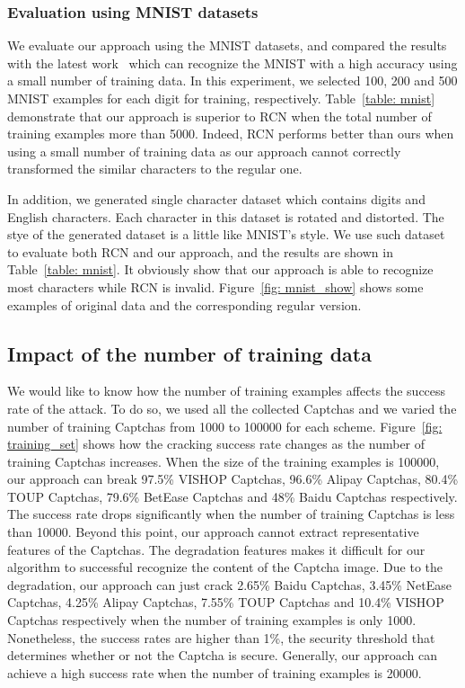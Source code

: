 \subsubsection{Evaluation using MNIST datasets}
We evaluate our approach using the MNIST datasets, and compared the results with the latest work~\cite{George2017A} which can recognize the MNIST with a high accuracy using a small number of training data. In this experiment, we selected 100, 200 and 500 MNIST examples for each digit for training, respectively.
Table~\ref{table: mnist} demonstrate that our approach is superior to RCN when the total number of training examples more than 5000. Indeed, RCN performs better than ours when using a small number of training data as our approach cannot correctly transformed the similar characters to the regular one.

In addition, we generated single character dataset which contains digits and English characters. Each character in this dataset is rotated and distorted. The stye of the generated dataset is a little like MNIST's style.
We use such dataset to evaluate both RCN and our approach, and the results are shown in Table~\ref{table: mnist}. It obviously show that our approach is able to recognize most characters while RCN is invalid. Figure~\ref{fig: mnist_show} shows some examples of original data and the corresponding regular version.

\subsection{Impact of the number of training data}
We would like to know how the number of training examples affects the success rate of the attack. To do so, we used all the collected Captchas and we varied the number of training Captchas from 1000 to 100000 for each scheme. Figure~\ref{fig: training_set} shows how the cracking success rate changes as the number of training Captchas increases. When the size of the training examples is 100000, our approach can break 97.5\% VISHOP Captchas, 96.6\% Alipay Captchas, 80.4\% TOUP Captchas, 79.6\% BetEase Captchas and 48\% Baidu Captchas respectively. The success rate drops significantly when the number of training Captchas is less than 10000. Beyond this point, our approach cannot extract representative features of the Captchas. The degradation features makes it difficult for our algorithm to successful recognize the content of the Captcha image.
Due to the degradation, our approach can just crack 2.65\% Baidu Captchas, 3.45\% NetEase Captchas, 4.25\% Alipay Captchas, 7.55\% TOUP Captchas and 10.4\% VISHOP Captchas respectively when the number of training examples is only 1000. Nonetheless, the success rates are higher than 1\%, the security threshold that determines whether or not the Captcha is secure.
Generally, our approach can achieve a high success rate when the number of training examples is 20000.

